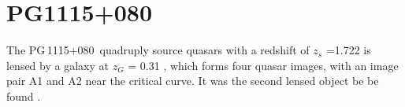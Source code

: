 \documentclass[useAMS,usenatbib]{mnras}
\newcommand\rxj{RXJ\,1131$-$1231}
\newcommand\he{HE\,0435$-$1223}
\newcommand\pg{PG\,1115$+$080}
\begin{document}







\section{PG1115+080}
\label{subsec:PG}
The \pg~quadruply source quasars with a redshift of $z_{s}$ =1.722 is lensed by a galaxy at $z_{G}$ = 0.31 \citep{HenryEtal86,ChristianEtal87,Tonry98}, which forms four quasar images, with an image pair A1 and A2 near the critical curve. It was the second lensed object be be found \citep{WeymannEtal80}. 
\end{document}
